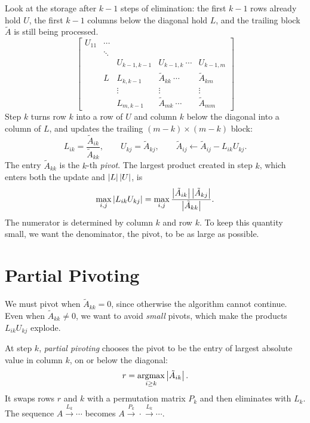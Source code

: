 Look at the storage after $k - 1$ steps of elimination: the first $k - 1$ rows already hold $U$, the first $k - 1$ columns below the diagonal hold $L$, and the trailing block $\tilde{A}$ is still being processed.
\begin{equation}
  \begin{bmatrix}
    U_{11} & \cdots & & & \\
    & \ddots & & & \\
    & & U_{k-1,k-1} & U_{k-1,k} \ \cdots & U_{k-1,m} \\
    & L & L_{k,k-1} & \tilde{A}_{kk} \ \cdots & \tilde{A}_{km} \\
    & & \vdots & \vdots & \vdots \\
    & & L_{m,k-1} & \tilde{A}_{mk} \ \cdots & \tilde{A}_{mm}
  \end{bmatrix}
\end{equation}
Step $k$ turns row $k$ into a row of $U$ and column $k$ below the diagonal into a column of $L$, and updates the trailing $(m - k) \times (m - k)$ block:
\begin{equation}
  L_{ik} = \frac{\tilde{A}_{ik}}{\tilde{A}_{kk}}, \qquad U_{kj} = \tilde{A}_{kj}, \qquad \tilde{A}_{ij} \gets \tilde{A}_{ij} - L_{ik}U_{kj}.
\end{equation}
The entry $\tilde{A}_{kk}$ is the $k$-th \emph{pivot}. The largest product created in step $k$, which enters both the update and $\left\lvert L \right\rvert\left\lvert U \right\rvert$, is
\begin{equation}
  \max_{i,j}\left\lvert L_{ik}U_{kj} \right\rvert = \max_{i,j}\frac{\left\lvert \tilde{A}_{ik} \right\rvert\left\lvert \tilde{A}_{kj} \right\rvert}{\left\lvert \tilde{A}_{kk} \right\rvert}.
\end{equation}
The numerator is determined by column $k$ and row $k$. To keep this quantity small, we want the denominator, the pivot, to be as large as possible.

\section{Partial Pivoting}

We must pivot when $\tilde{A}_{kk} = 0$, since otherwise the algorithm cannot continue. Even when $\tilde{A}_{kk} \ne 0$, we want to avoid \emph{small} pivots, which make the products $L_{ik}U_{kj}$ explode.

\begin{definition}
  At step $k$, \emph{partial pivoting} chooses the pivot to be the entry of largest absolute value in column $k$, on or below the diagonal:
  \begin{equation}
    r = \operatorname*{argmax}_{i \ge k}\left\lvert \tilde{A}_{ik} \right\rvert.
  \end{equation}
  It swaps rows $r$ and $k$ with a permutation matrix $P_k$ and then eliminates with $L_k$. The sequence $A \xrightarrow{L_k} \cdots$ becomes $A \xrightarrow{P_k} \cdot \xrightarrow{L_k} \cdots$.
\end{definition}

